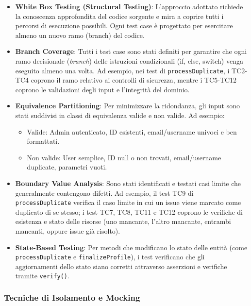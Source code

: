 ﻿\documentclass[11pt,a4paper]{article}
\begin{document}
\begin{itemize}
    \item \textbf{White Box Testing (Structural Testing)}: L'approccio adottato richiede la conoscenza approfondita del codice sorgente e mira a coprire tutti i percorsi di esecuzione possibili. Ogni test case è progettato per esercitare almeno un nuovo ramo (branch) del codice.
    
    \item \textbf{Branch Coverage}: Tutti i test case sono stati definiti per garantire che ogni ramo decisionale (\textit{branch}) delle istruzioni condizionali (if, else, switch) venga eseguito almeno una volta. Ad esempio, nei test di \texttt{processDuplicate}, i TC2-TC4 coprono il ramo relativo ai controlli di sicurezza, mentre i TC5-TC12 coprono le validazioni degli input e l'integrità del dominio.
    
    \item \textbf{Equivalence Partitioning}: Per minimizzare la ridondanza, gli input sono stati suddivisi in classi di equivalenza valide e non valide. Ad esempio:
        \begin{itemize}
            \item Valide: Admin autenticato, ID esistenti, email/username univoci e ben formattati.
            \item Non valide: User semplice, ID null o non trovati, email/username duplicate, parametri vuoti.
        \end{itemize}
    
    \item \textbf{Boundary Value Analysis}: Sono stati identificati e testati casi limite che generalmente contengono difetti. Ad esempio, il test TC9 di \texttt{processDuplicate} verifica il caso limite in cui un issue viene marcato come duplicato di se stesso; i test TC7, TC8, TC11 e TC12 coprono le verifiche di esistenza e stato delle risorse (uno mancante, l'altro mancante, entrambi mancanti, oppure issue già risolto).
    
    \item \textbf{State-Based Testing}: Per metodi che modificano lo stato delle entità (come \texttt{processDuplicate} e \texttt{finalizeProfile}), i test verificano che gli aggiornamenti dello stato siano corretti attraverso asserzioni e verifiche tramite \texttt{verify()}.
\end{itemize}

\subsubsection{Tecniche di Isolamento e Mocking}
\end{document}
